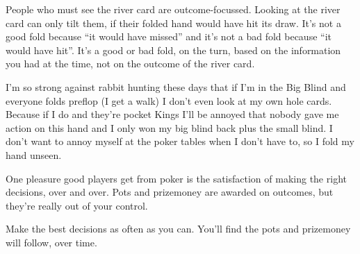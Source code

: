 People who must see the river card are outcome-focussed. Looking
at the river card can only tilt them, if their folded hand would
have hit its draw. It's not a good fold because ``it would have
missed'' and it's not a bad fold because ``it would have hit''. It's
a good or bad fold, on the turn, based on the information you
had at the time, not on the outcome of the river card.

I'm so strong against rabbit hunting these days that if I'm in the
Big Blind and everyone folds preflop (I get a walk) I don't even look
at my own hole cards. Because if I do and they're pocket Kings I'll be
annoyed that nobody gave me action on this hand and I only won my big
blind back plus the small blind. I don't want to annoy myself at the
poker tables when I don't have to, so I fold my hand unseen.

One pleasure good players get from poker is the satisfaction
of making the right decisions, over and over. Pots and prizemoney
are awarded on outcomes, but they're really out of your control.

Make the best decisions as often as you can. You'll find the pots
and prizemoney will follow, over time.
